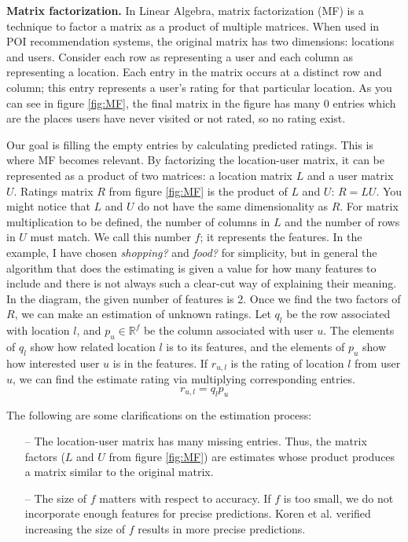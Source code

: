 \documentclass{sig-alternate}
\begin{document}
\textbf{Matrix factorization.} In Linear Algebra, matrix factorization (MF) is a technique to 
factor a matrix as a product of multiple matrices. When used in POI recommendation systems, 
the original matrix has two dimensions: locations and users. Consider each row as representing a user and each column 
as representing a location. Each entry in the matrix occurs at a distinct row and column; this entry represents a user's rating 
for that particular location. As you can see in figure \ref{fig:MF}, the final matrix in the figure
has many 0 entries which are the places users have never visited or not rated, so no rating exist. 

Our goal is filling the empty entries by calculating predicted ratings. This is where MF becomes
relevant. By factorizing the location-user matrix, it can be represented as a product of two matrices: 
a location matrix $L$ and a user matrix $U$. Ratings matrix $R$ from figure \ref{fig:MF} is the product of $L$ and $U$:  $R = L U$. 
You might notice that $L$ and $U$ do not have the same dimensionality as $R$. For matrix multiplication to be defined, the number of columns in $L$ and the number of rows in $U$ must match.  
We call this number $f$; it represents the features. In the example, I have chosen  \emph{shopping?} and  \emph{food?} for simplicity, 
but in general the algorithm that does the estimating is given a value for how many features to include and there is not always such a clear-cut way of explaining their meaning. In the diagram, the given number of features is 2. Once we find the two 
factors of $R$, we can make an estimation of unknown ratings. Let $q_l$ be the row associated with location $l$, and 
$p_u \in \mathbb{R}^f$ be the column associated with user $u$. The elements of $q_l$ show how related location $l$ is to its features, 
and the elements of $p_u$ show how interested user $u$ is in the features. If $r_{u,l}$ is the rating of location $l$ 
from user $u$, we can find the estimate rating via multiplying corresponding entries. ~\cite{Koren:2009}
\begin{equation}
	r_{u,l}= q_l p_u
\label{eq:MF}
\end{equation}

The following are some clarifications on the estimation process:
\begin{itemize}
\item[--] The location-user matrix has many missing entries. Thus, the matrix factors ($L$ and $U$ from figure \ref{fig:MF}) are 
estimates whose product produces a matrix similar to the original matrix.
\item[--] The size of $f$ matters with respect to accuracy. If $f$ is too small, we do not 
incorporate enough features for precise predictions. Koren et al. \cite{Koren:2009} verified 
increasing the size of $f$ results in more precise predictions.
\end{itemize}
\end{document}
